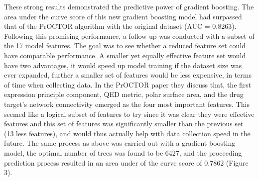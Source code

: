 \documentclass[12pt]{article}
\begin{document}
These strong results demonstrated the predictive power of gradient boosting. The area under the curve score of this new gradient boosting model had surpassed that of the PrOCTOR algorithm with the original dataset (AUC = 0.8263). Following this promising performance, a follow up was conducted with a subset of the 17 model features. The goal was to see whether a reduced feature set could have comparable performance. A smaller yet equally effective feature set would have two advantages, it would speed up model training if the dataset size was ever expanded, further a smaller set of features would be less expensive, in terms of time when collecting data. In the PrOCTOR paper they discuss that, the first expression principle component, QED metric, polar surface area, and the drug target’s network connectivity emerged as the four most important features. This seemed like a logical subset of features to try since it was clear they were effective features and this set of features was significantly smaller than the previous set (13 less features), and would thus actually help with data collection speed in the future. The same process as above was carried out with a gradient boosting model, the optimal number of trees was found to be 6427, and the proceeding prediction process resulted in an area under of the curve score of 0.7862 (Figure 3).
\end{document}
